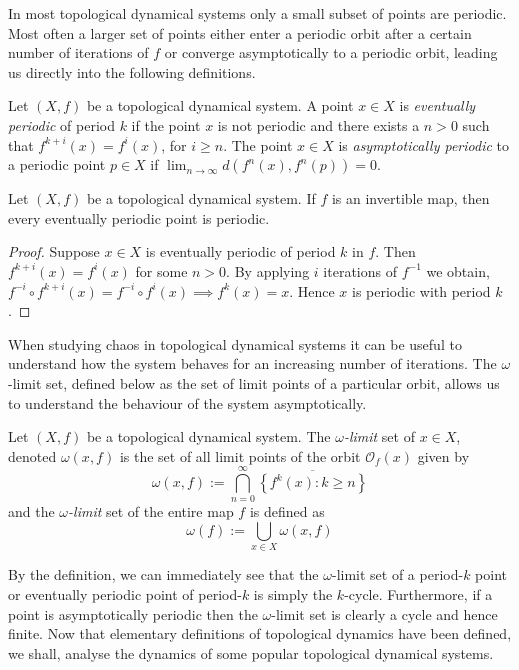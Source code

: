 In most topological dynamical systems only a small subset of points are periodic. Most often a larger set of points either enter a periodic orbit after a certain number of iterations of $f$ or converge asymptotically to a periodic orbit, leading us directly into the following definitions.

\begin{defn} \label{defn:eventually-asymptotically-periodic}
    Let $(X, f)$ be a topological dynamical system. A point $x \in X$ is \emph{eventually periodic} of period $k$ if the point $x$ is not periodic and there exists a $n > 0$ such that $f^{k+i}(x) = f^i(x)$, for $i \geq n$. The point $x \in X$ is \emph{asymptotically periodic} to a periodic point $p \in X$ if $\lim_{n \to \infty} d(f^n(x), f^n(p)) = 0$.
\end{defn}

\begin{prop} \label{prop:eventually-periodic-implies-periodic}
    Let $(X, f)$ be a topological dynamical system. If $f$ is an invertible map, then every eventually periodic point is periodic.
    \begin{proof}
        Suppose $x \in X$ is eventually periodic of period $k$ in $f$. Then $f^{k + i}(x) = f^i(x)$ for some $n > 0$. By applying $i$ iterations of $f^{-1}$ we obtain, $f^{-i} \circ f^{k + i}(x) = f^{-i} \circ f^{i}(x) \implies f^k(x) = x$. Hence $x$ is periodic with period $k$.
    \end{proof}
\end{prop}

When studying chaos in topological dynamical systems it can be useful to understand how the system behaves for an increasing number of iterations. The $\omega$-limit set, defined below as the set of limit points of a particular orbit, allows us to understand the behaviour of the system asymptotically.

\begin{defn} \label{defn:omega-limit-set}
    Let $(X, f)$ be a topological dynamical system. The $\omega$\emph{-limit} set of $x \in X$, denoted $\omega(x, f)$ is the set of all limit points of the orbit $\mathcal{O}_f(x)$ given by \[\omega(x, f) := \bigcap_{n=0}^\infty\overline{\left\lbrace f^k(x) : k \geq n \right\rbrace}\] and the $\omega$\emph{-limit} set of the entire map $f$ is defined as \[\omega(f) := \bigcup_{x \in X} \omega(x, f)\]
\end{defn}

By the definition, we can immediately see that the $\omega$-limit set of a period-$k$ point or eventually periodic point of period-$k$ is simply the $k$-cycle. Furthermore, if a point is asymptotically periodic then the $\omega$-limit set is clearly a cycle and hence finite. Now that elementary definitions of topological dynamics have been defined, we shall, analyse the dynamics of some popular topological dynamical systems.

